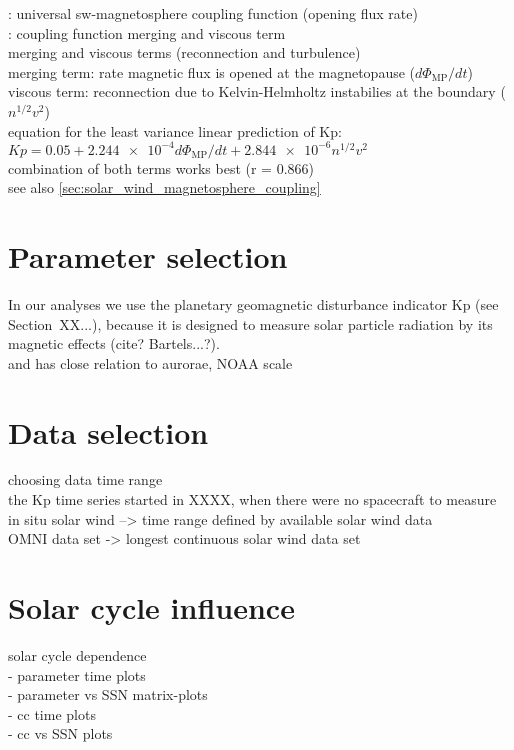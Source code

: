 \citet{Newell2007}: universal sw-magnetosphere coupling function (opening flux rate)\\
\citet{Newell2008}: coupling function merging and viscous term\\
merging and viscous terms (reconnection and turbulence)\\
merging term: rate magnetic flux is opened at the magnetopause ($d\Phi_\text{MP}/dt$)\\
viscous term: reconnection due to Kelvin-Helmholtz instabilies at the boundary ($n^{1/2} v^2$)\\
equation for the least variance linear prediction of Kp: $Kp = 0.05 + \num{2.244e-4} d\Phi_\text{MP}/dt + \num{2.844e-6} n^{1/2} v^2$\\
combination of both terms works best (r = 0.866)\\

see also \autoref{sec:solar_wind_magnetosphere_coupling}\\


\section{Parameter selection}
In our analyses we use the planetary geomagnetic disturbance indicator Kp (see Section~XX...), because it is designed to measure solar particle radiation by its magnetic effects (cite? Bartels...?).\\
and has close relation to aurorae, NOAA scale\\

\section{Data selection}
choosing data time range\\
the Kp time series started in XXXX, when there were no spacecraft to measure in situ solar wind --> time range defined by available solar wind data\\
OMNI data set -> longest continuous solar wind data set\\

\section{Solar cycle influence}
solar cycle dependence\\
- parameter time plots\\
- parameter vs SSN matrix-plots\\
- cc time plots\\
- cc vs SSN plots\\

